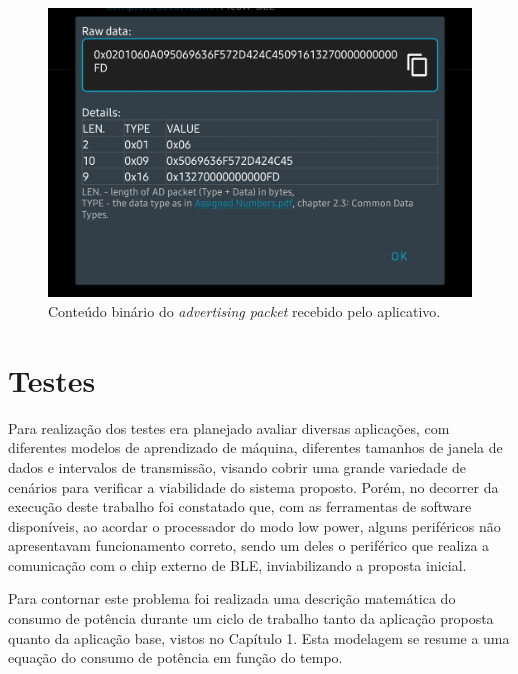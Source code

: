\documentclass[a5paper]{ufsc-thesis}  %
\begin{document}
\begin{figure}[h]
    \centering
    \includegraphics[width=0.6\linewidth]{imagens/nRF2.png}
    \caption{Conteúdo binário do \textit{advertising packet} recebido pelo aplicativo.}
    \label{fig:nRF2}
\end{figure}

\chapter{Testes}
Para realização dos testes era planejado avaliar diversas aplicações, com diferentes modelos de aprendizado de máquina, diferentes tamanhos de janela de dados e intervalos de transmissão, visando cobrir uma grande variedade de cenários para verificar a viabilidade do sistema proposto. Porém, no decorrer da execução deste trabalho foi constatado que, com as ferramentas de software disponíveis, ao acordar o processador do modo low power, alguns periféricos não apresentavam funcionamento correto, sendo um deles o periférico que realiza a comunicação com o chip externo de BLE, inviabilizando a proposta inicial.

Para contornar este problema foi realizada uma descrição matemática do consumo de potência durante um ciclo de trabalho tanto da aplicação proposta quanto da aplicação base, vistos no Capítulo 1. Esta modelagem se resume a uma equação do consumo de potência em função do tempo.
\end{document}

